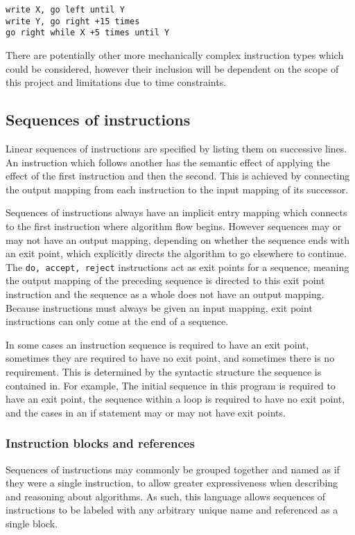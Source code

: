 \documentclass[11pt]{article}
\begin{document}
\begin{verbatim}
write X, go left until Y
write Y, go right +15 times
go right while X +5 times until Y
\end{verbatim}

There are potentially other more mechanically complex instruction types which could be considered, however their inclusion will be dependent on the scope of this project and limitations due to time constraints.

\subsection{Sequences of instructions}

Linear sequences of instructions are specified by listing them on successive lines. An instruction which follows another has the semantic effect of applying the effect of the first instruction and then the second. This is achieved by connecting the output mapping from each instruction to the input mapping of its successor.

Sequences of instructions always have an implicit entry mapping which connects to the first instruction where algorithm flow begins. However sequences may or may not have an output mapping, depending on whether the sequence ends with an exit point, which explicitly directs the algorithm to go elsewhere to continue. The \texttt{do, accept, reject} instructions act as exit points for a sequence, meaning the output mapping of the preceding sequence is directed to this exit point instruction and the sequence as a whole does not have an output mapping. Because instructions must always be given an input mapping, exit point instructions can only come at the end of a sequence.

In some cases an instruction sequence is required to have an exit point, sometimes they are required to have no exit point, and sometimes there is no requirement. This is determined by the syntactic structure the sequence is contained in. For example, The initial sequence in this program is required to have an exit point, the sequence within a loop is required to have no exit point, and the cases in an if statement may or may not have exit points.

\subsubsection{Instruction blocks and references}

Sequences of instructions may commonly be grouped together and named as if they were a single instruction, to allow greater expressiveness when describing and reasoning about algorithms. As such, this language allows sequences of instructions to be labeled with any arbitrary unique name and referenced as a single block.
\end{document}
